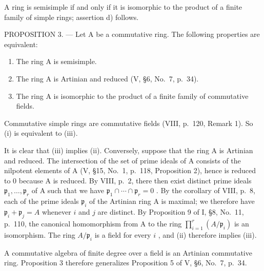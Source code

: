 A ring is semisimple if and only if it is isomorphic to the product of a finite family of simple rings; assertion d) follows.

PROPOSITION 3. --- Let A be a commutative ring. The following properties are equivalent:

\begin{enumerate}
\def\labelenumi{(\roman{enumi})}
\item
  The ring A is semisimple.
\item
  The ring A is Artinian and reduced (V, §6, No.~7, p.~34).
\item
  The ring A is isomorphic to the product of a finite family of commutative fields.
\end{enumerate}

Commutative simple rings are commutative fields (VIII, p.~120, Remark 1). So (i) is equivalent to (iii).

It is clear that (iii) implies (ii). Conversely, suppose that the ring A is Artinian and reduced. The intersection of the set of prime ideals of A consists of the nilpotent elements of A (V, §15, No.~1, p.~118, Proposition 2), hence is reduced to 0 because A is reduced. By VIII, p.~2, there then exist distinct prime ideals \(\mathfrak{p}_1, \ldots, \mathfrak{p}_r\) of A such that we have \(\mathfrak{p}_1 \cap \cdots \cap \mathfrak{p}_r = 0\) . By the corollary of VIII, p.~8, each of the prime ideals \(\mathfrak{p}_i\) of the Artinian ring A is maximal; we therefore have \(\mathfrak{p}_i + \mathfrak{p}_j = A\) whenever \(i\) and \(j\) are distinct. By Proposition 9 of I, §8, No.~11, p.~110, the canonical homomorphism from A to the ring \(\prod_{i=1}^{r} (A / \mathfrak{p}_i)\) is an isomorphism. The ring \(A / \mathfrak{p}_i\) is a field for every \(i\) , and (ii) therefore implies (iii).

A commutative algebra of finite degree over a field is an Artinian commutative ring. Proposition 3 therefore generalizes Proposition 5 of V, §6, No.~7, p.~34.

